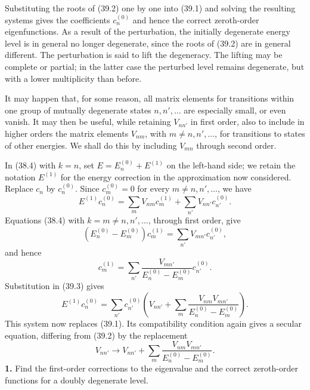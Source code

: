 Substituting the roots of (39.2) one by one into (39.1) and solving the
resulting systems gives the coefficients $c_n^{(0)}$ and hence the correct
zeroth-order eigenfunctions.
As a result of the perturbation, the initially degenerate energy level is in
general no longer degenerate, since the roots of (39.2) are in general
different. The perturbation is said to lift the degeneracy. The lifting may
be complete or partial; in the latter case the perturbed level remains
degenerate, but with a lower multiplicity than before.

It may happen that, for some reason, all matrix elements for transitions
within one group of mutually degenerate states $n,n',\ldots$ are especially
small, or even vanish. It may then be useful, while retaining $V_{nn'}$ in
first order, also to include in higher orders the matrix elements $V_{nm}$,
with $m\ne n,n',\ldots$, for transitions to states of other energies. We
shall do this by including $V_{mn}$ through second order.

In (38.4) with $k=n$, set $E=E_n^{(0)}+E^{(1)}$ on the left-hand side; we
retain the notation $E^{(1)}$ for the energy correction in the approximation
now considered. Replace $c_n$ by $c_n^{(0)}$. Since $c_m^{(0)}=0$ for every
$m\ne n,n',\ldots$, we have
\begin{equation}
  E^{(1)}c_n^{(0)}=\sum_mV_{nm}c_m^{(1)}
  +\sum_{n'}V_{nn'}c_{n'}^{(0)}.
  \tag{39.3}
\end{equation}
Equations (38.4) with $k=m\ne n,n',\ldots$, through first order, give
\[
  (E_n^{(0)}-E_m^{(0)})c_m^{(1)}
  =\sum_{n'}V_{mn'}c_{n'}^{(0)},
\]
and hence
\[
  c_m^{(1)}=\sum_{n'}\frac{V_{mn'}}{E_n^{(0)}-E_m^{(0)}}c_{n'}^{(0)}.
\]
Substitution in (39.3) gives
\[
  E^{(1)}c_n^{(0)}=\sum_{n'}c_{n'}^{(0)}
  \left(V_{nn'}+\sum_m\frac{V_{nm}V_{mn'}}{E_n^{(0)}-E_m^{(0)}}\right).
\]
This system now replaces (39.1). Its compatibility condition again gives a
secular equation, differing from (39.2) by the replacement
\begin{equation}
  V_{nn'}\longrightarrow V_{nn'}
  +\sum_m\frac{V_{nm}V_{mn'}}{E_n^{(0)}-E_m^{(0)}}.
  \tag{39.4}
\end{equation}
\ProblemHeading
\textbf{1.} Find the first-order corrections to the eigenvalue and the
correct zeroth-order functions for a doubly degenerate level.


